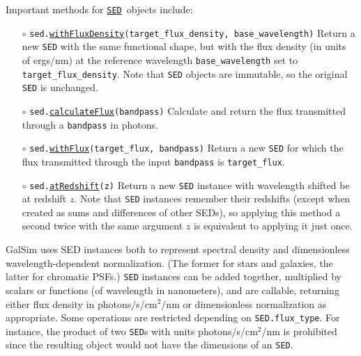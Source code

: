 \documentclass[preprint,10pt]{../../devel/modules/aastex}
\newcommand\SED{\href{http://galsim-developers.github.io/GalSim/classgalsim_1_1sed_1_1_s_e_d.html}{\texttt{SED}}}
\begin{document}
Important methods for \SED\ objects include:
\begin{itemize}
  \item[$\circ$]
  \texttt{sed.\href{http://galsim-developers.github.io/GalSim/classgalsim_1_1sed_1_1_s_e_d.html\#abd38352d0cd9327ba255b8f327562992}{withFluxDensity}(target\_flux\_density,
    base\_wavelength)}
      \newline
      Return a new \texttt{SED} with the same functional shape,
      but with the flux
      density (in units of ergs/nm) at the reference
      wavelength \texttt{base\_wavelength} set to
      \texttt{target\_flux\_density}.  Note that \texttt{SED} objects are
      immutable, so the original \texttt{SED} is unchanged.
  \item[$\circ$]
  \texttt{sed.\href{http://galsim-developers.github.io/GalSim/classgalsim_1_1sed_1_1_s_e_d.html\#ab20b0c861f5b6a6604fe838b83a4d6cc}{calculateFlux}(bandpass)}
    \newline
    Calculate and return the flux transmitted through a
    \texttt{bandpass} in photons.
  \item[$\circ$]
  \texttt{sed.\href{http://galsim-developers.github.io/GalSim/classgalsim_1_1sed_1_1_s_e_d.html\#a33613fdc3b0f99534971e9651ea2e659}{withFlux}(target\_flux, bandpass)}
    \newline
    Return a new \texttt{SED}
    for which the flux transmitted through the input \texttt{bandpass} is \texttt{target\_flux}.
  \item[$\circ$]
  \texttt{sed.\href{http://galsim-developers.github.io/GalSim/classgalsim_1_1sed_1_1_s_e_d.html\#a9d49d109ff539f61ab022e1be6391b12}{atRedshift}(z)}
    \newline
    Return a new \texttt{SED} instance with wavelength shifted be at redshift $z$.
    Note that \texttt{SED} instances remember their redshifts (except when created as sums and
    differences of
    other SEDs), so applying this method a second twice with the same argument $z$ is equivalent
    to applying it just once.
\end{itemize}

GalSim uses SED instances both to represent spectral density and dimensionless wavelength-dependent
normalization.  (The former for stars and galaxies, the latter for chromatic PSFs.)  \texttt{SED}
instances can be added together, multiplied by scalars or functions (of wavelength in nanometers),
and are callable, returning either flux density in photons/s/cm$^2$/nm or dimensionless
normalization as appropriate.  Some operations are restricted depending on \texttt{SED.flux\_type}.
For instance, the product of two \texttt{SED}s with units photons/s/cm$^2$/nm is prohibited since
the resulting object would not have the dimensions of an \texttt{SED}.
\end{document}
